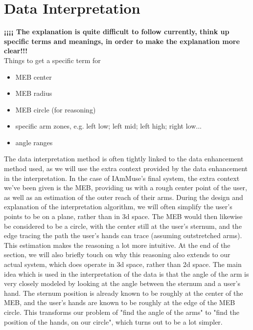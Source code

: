 \section{Data Interpretation}
\label{section: methodology - data interpretation}

\textbf{¡¡¡¡ The explanation is quite difficult to follow currently, think up specific terms and meanings, in order to make the explanation more clear!!!}\\
Things to get a specific term for
\begin{itemize}
    \item MEB center
    \item MEB radius
    \item MEB circle (for reasoning)
    \item specific arm zones, e.g. left low; left mid; left high; right low...
    \item angle ranges
\end{itemize}

The data interpretation method is often tightly linked to the data enhancement method used, as we will use the extra context provided by the data enhancement in the interpretation.
In the case of IAmMuse's final system, the extra context we've been given is the MEB, providing us with a rough center point of the user, as well as an estimation of the outer reach of their arms.
During the design and explanation of the interpretation algorithm, we will often simplify the user's points to be on a plane, rather than in 3d space. 
The MEB would then likewise be considered to be a circle, with the center still at the user's sternum, and the edge tracing the path the user's hands can trace (assuming outstretched arms).
This estimation makes the reasoning a lot more intuitive. At the end of the section, we will also briefly touch on why this reasoning also extends to our actual system, which does operate in 3d space, rather than 2d space.
The main idea which is used in the interpretation of the data is that the angle of the arm is very closely modeled by looking at the angle between the sternum and a user's hand.
The sternum position is already known to be roughly at the center of the MEB, and the user's hands are known to be roughly at the edge of the MEB circle.
This transforms our problem of "find the angle of the arms" to "find the position of the hands, on our circle", which turns out to be a lot simpler.

